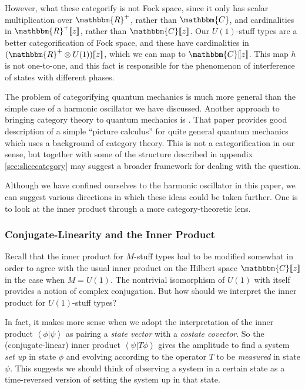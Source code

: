\documentclass{amsart} \usepackage{amsmath,amssymb,bbm}
\newcommand{\URz}{(\mathbbm{R}^+ \otimes U(1))[\![z]\!]}
\newcommand{\Cz}{\mathbbm{C}[\![z]\!]}
\newcommand{\inprod}[1]{\left\langle{#1}\right\rangle}
\begin{document}
However, what these categorify is not Fock space, since it only has
scalar multiplication over $\mathbbm{R}^+$, rather than $\mathbbm{C}$,
and cardinalities in $\mathbbm{R}^+[\![z]\!]$, rather than $\Cz$.  Our
$U(1)$-stuff types are a better categorification of Fock space, and
these have cardinalities in $\URz$, which we can map to $\Cz$.  This
map $h$ is not one-to-one, and this fact is responsible for the
phenomenon of interference of states with different phases.

The problem of categorifying quantum mechanics is much more general
than the simple case of a harmonic oscillator we have discussed.
Another approach to bringing category theory to quantum mechanics is
{\cite{coecke}}.  That paper provides good description of a simple
``picture calculus'' for quite general quantum mechanics which uses a
background of category theory.  This is not a categorification in our
sense, but together with some of the structure described in appendix
\ref{sec:slicecategory} may suggest a broader framework for dealing
with the question.

Although we have confined ourselves to the harmonic oscillator in this
paper, we can suggest various directions in which these ideas could be
taken further.  One is to look at the inner product through a more
category-theoretic lens.

\subsubsection{Conjugate-Linearity and the Inner Product}\label{sec:conjtimereversal}

Recall that the inner product for $M$-stuff types had to be modified
somewhat in order to agree with the usual inner product on the Hilbert
space $\Cz$ in the case when $M=U(1)$.  The nontrivial isomorphism of
$U(1)$ with itself provides a notion of complex conjugation.  But how
should we interpret the inner product for $U(1)$-stuff types?  

In fact, it makes more sense when we adopt the interpretation of the
inner product $\inprod{\phi|\psi}$ as pairing a \textit{state vector}
with a \textit{costate covector}.  So the (conjugate-linear) inner
product $\inprod{\psi|T\phi}$ gives the amplitude to find a system
\textit{set up} in state $\phi$ and evolving according to the operator
$T$ to be \textit{measured} in state $\psi$.  This suggests we should
think of observing a system in a certain state as a time-reversed
version of setting the system up in that state.
\end{document}

